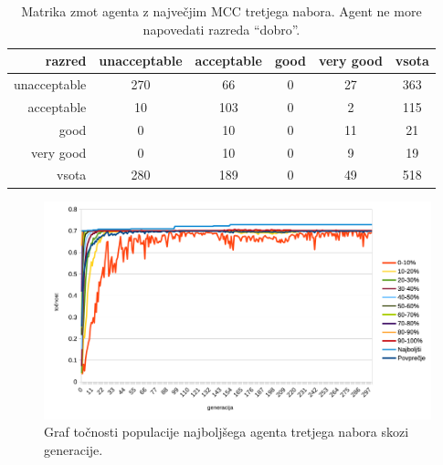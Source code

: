 \begin{table}[H]
    \centering
    \begin{tabular}{||rccccc||}
        \hline
        razred       & unacceptable & acceptable & good & very good & vsota \\ \hline
        unacceptable & 270          & 66         & 0    & 27        & 363   \\ \hline
        acceptable   & 10           & 103        & 0    & 2         & 115   \\ \hline
        good         & 0            & 10         & 0    & 11        & 21    \\ \hline
        very good    & 0            & 10         & 0    & 9         & 19    \\ \hline
        vsota        & 280          & 189        & 0    & 49        & 518   \\ \hline
    \end{tabular}
    \caption{Matrika zmot agenta z največjim MCC tretjega nabora. Agent ne more napovedati razreda \enquote{dobro}.}
    \label{tab:car_mcc_3}
\end{table}

\begin{figure}[H]
    \begin{center}
        \includegraphics[width=13cm]{car/3/acc}
    \end{center}
    \caption{Graf točnosti populacije najboljšega agenta tretjega nabora skozi generacije.}
    \label{fig:car_acc_3}
\end{figure}

